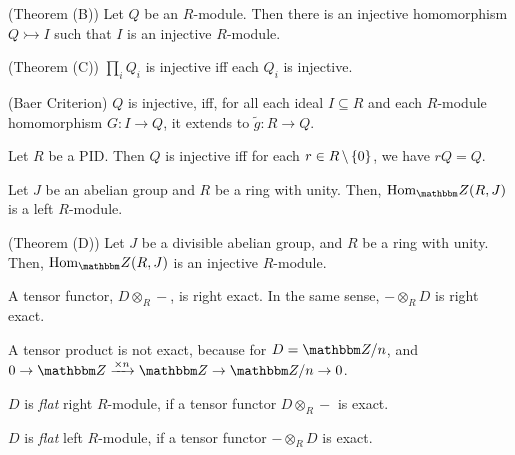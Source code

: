 \documentclass{article}
\begin{document}
\begin{theorem}(Theorem (B))
  Let \(Q\) be an \(R\)-module.
  Then there is an injective homomorphism \(Q \rightarrowtail I\)
  such that \(I\) is an injective \(R\)-module.
\end{theorem}

\begin{theorem}(Theorem (C))
  \(\prod_{i} Q_i\) is injective iff each \(Q_i\) is injective.
\end{theorem}

\begin{theorem}(Baer Criterion)
  \(Q\) is injective, iff, for all each ideal \(I \subseteq R\)
  and each \(R\)-module homomorphism \(G: I \to Q\),
  it extends to \(\tilde g: R \to Q\).
\end{theorem}

\begin{corollary}
  Let \(R\) be a PID.
  Then \(Q\) is injective
  iff
  for each \(r \in R \,\backslash\, \{0\}\),
  we have \(rQ = Q\).
\end{corollary}

\begin{lemma}
  Let \(J\) be an abelian group
  and \(R\) be a ring with unity.
  Then, \(\Hom_\bbZ(R, J)\) is a left \(R\)-module.
\end{lemma}

\begin{theorem}(Theorem (D))
  Let \(J\) be a divisible abelian group,
  and \(R\) be a ring with unity.
  Then, \(\Hom_\bbZ(R, J)\) is an injective \(R\)-module.
\end{theorem}

\begin{theorem}
  A tensor functor, \(D \otimes_R -\), is right exact.
  In the same sense, \(- \otimes_R D\) is right exact.
\end{theorem}
\begin{example}
  A tensor product is not exact, because for \(D = \bbZ / n\),
  and
  \(0 \to \bbZ \xrightarrow{\times n} \bbZ \to \bbZ/n \to 0\).
\end{example}

\begin{definition}
  \(D\) is \emph{flat} right \(R\)-module,
  if a tensor functor \(D \otimes_R -\) is exact.

  \(D\) is \emph{flat} left \(R\)-module,
  if a tensor functor \(- \otimes_R D\) is exact.
\end{definition}
\end{document}
